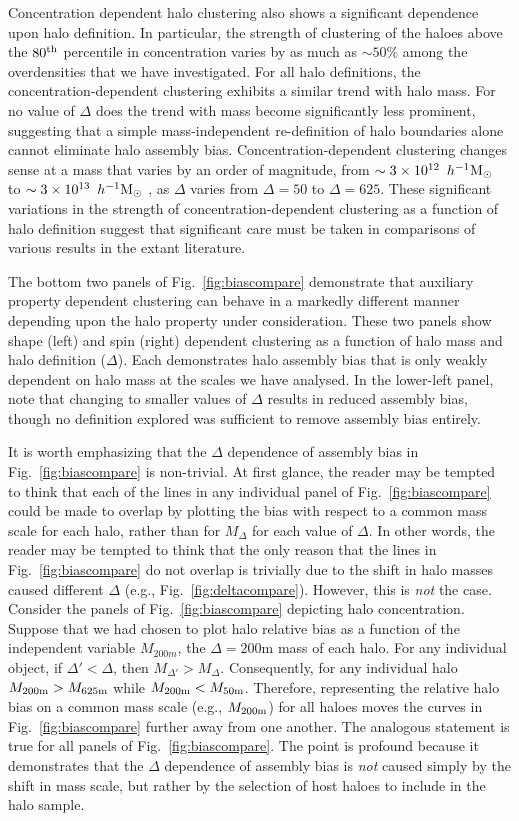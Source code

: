 \documentclass[usenatbib,fleqn]{mnras}
\begin{document}
Concentration dependent halo clustering also shows a significant dependence upon halo definition. In particular, the strength of clustering of the haloes above the $80^{\rm{th}}$ percentile in concentration varies by as much as $\sim 50\%$ among the overdensities that we have investigated. For all halo definitions, 
the concentration-dependent clustering exhibits a similar trend with halo mass. For no value of $\Delta$ does the trend with mass become significantly less prominent, suggesting that a simple mass-independent re-definition of halo boundaries alone cannot eliminate halo assembly bias. Concentration-dependent clustering changes sense at a mass that varies by an order of magnitude, from $\sim 3 \times 10^{12}\, \ h^{-1}\mathrm{M}_{\odot}~$ to $\sim 3 \times 10^{13}\, \ h^{-1}\mathrm{M}_{\odot}~$, as $\Delta$ varies from $\Delta=50$ to $\Delta=625$. These significant variations in the strength of concentration-dependent clustering as a function of halo definition suggest that significant care must be taken in comparisons of various results in the extant literature.

The bottom two panels of Fig.~\ref{fig:biascompare} demonstrate that auxiliary property dependent clustering can behave in a markedly different manner depending upon the halo property under consideration. These two panels show shape (left) and spin (right) dependent clustering as a function of halo mass and halo definition ($\Delta$). Each demonstrates halo assembly bias that is only weakly dependent on halo mass at the scales we have analysed. In the lower-left panel, note that changing to smaller values of $\Delta$ results in reduced assembly bias, though no definition explored was sufficient to remove assembly bias entirely. 

It is worth emphasizing that the $\Delta$ dependence of assembly bias in Fig.~\ref{fig:biascompare} is non-trivial. At first glance, the reader may be tempted to think that each of the lines in any individual panel of Fig.~\ref{fig:biascompare} could be made to overlap by plotting the bias with respect to a common mass scale for each halo, rather than for $M_{\Delta}$ for each value of $\Delta$. In other words, the reader may be tempted to think that the only reason that the lines in Fig.~\ref{fig:biascompare} do not overlap is trivially due to the shift in halo masses caused different $\Delta$ (e.g., Fig.~\ref{fig:deltacompare}). However, this is {\em not} the case. Consider the panels of Fig.~\ref{fig:biascompare} depicting halo concentration. Suppose that we had chosen to plot halo relative bias as a function of the independent variable $M_{200m}$, the $\Delta=200$m mass of each halo. For any individual object, if $\Delta' < \Delta$, then $M_{\Delta'} > M_{\Delta}$. Consequently, for any individual halo $M_{200{\rm m}} > M_{625{\rm m}}$ while $M_{200{\rm m}} < M_{50{\rm m}}$. Therefore, representing the relative halo bias on a common mass scale (e.g., $M_{200{\rm m}}$) for all haloes moves the curves in Fig.~\ref{fig:biascompare} further away from one another. The analogous statement is true for all panels of Fig.~\ref{fig:biascompare}. The point is profound because it demonstrates that the $\Delta$ dependence of assembly bias is {\em not} caused simply by the shift in mass scale, but rather by the selection of host haloes to include in the halo sample. 
\end{document}
